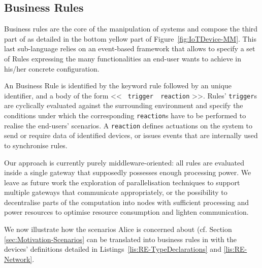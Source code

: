 \subsection{Business Rules}
\label{sec:IoTDSL-BusinessRules}

Business rules are the core of the manipulation of \IOT systems and compose the third part of \IOTDSL as detailed in the bottom yellow part of Figure~\ref{fig:IoTDevice-MM}. This last sub-language relies on an event-based framework that allows to specify a set of \textsf{Rule}s expressing the many functionalities an end-user wants to achieve in his/her concrete configuration. 

An \IOTDSL Business Rule is identified by the keyword \textsf{rule} followed by an unique identifier, and a body of the form << \texttt{\textbf{\color{codeviolet}{when}} trigger \textbf{\color{codeviolet}{do}} reaction} >>. Rules' \texttt{trigger}s are cyclically evaluated against the surrounding environment and specify the conditions under which the corresponding \texttt{reaction}s have to be performed to realise the end-users' scenarios. A \texttt{reaction} defines actuations on the \IOT system to send or require data of identified devices, or issues events that are internally used to synchronise rules. 


Our approach is currently purely middleware-oriented: all rules are evaluated inside a single gateway that supposedly possesses enough processing power. We leave as future work the exploration of parallelisation techniques to support multiple gateways that communicate appropriately, or the possibility to decentralise parts of the computation into nodes with sufficient processing and power resources to optimise resource consumption and lighten communication. 

We now illustrate how the scenarios Alice is concerned about (cf. Section \ref{sec:Motivation-Scenarios} can be translated into business rules in \IOTDSL with the devices' definitions detailed in Listings~\ref{lis:RE-TypeDeclarations} and \ref{lis:RE-Network}. 

